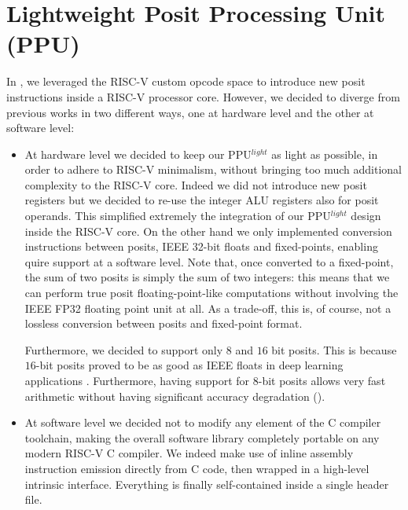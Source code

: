 \section{Lightweight Posit Processing Unit (PPU)}

In \cite{ppulight}, we leveraged the RISC-V custom opcode space to introduce new posit instructions inside a RISC-V processor core.
However, we decided to diverge from previous works in two different ways, one at hardware level and the other at software level:
\begin{itemize}
    \item At hardware level we decided to keep our PPU$^{light}$ as light as possible, in order to adhere to RISC-V minimalism, without bringing too much additional complexity to the RISC-V core. Indeed we did not introduce new posit registers but we decided to re-use the integer ALU registers also for posit operands. This simplified extremely the integration of our PPU$^{light}$ design inside the RISC-V core. On the other hand we only implemented conversion instructions between posits, IEEE 32-bit floats  and fixed-points, enabling quire support at a software level. Note that, once converted to a fixed-point, the sum of two posits is simply the sum of two integers: this means that we can perform true posit floating-point-like computations without involving the IEEE FP32 floating point unit at all. As a trade-off, this is, of course, not a lossless conversion between posits and fixed-point format.
    
    Furthermore, we decided to support only $8$ and $16$ bit posits. This is because $16$-bit posits proved to be as good as IEEE floats in deep learning applications \cite{deeppositron,positnn,9066876}. Furthermore, having support for $8$-bit posits allows very fast arithmetic without having significant accuracy degradation (\cite{coco_et_al_ieeespm_2020,coco2020sensors}).
    \item At software level we decided not to modify any element of the C compiler toolchain, making the overall software library completely portable on any modern RISC-V C compiler. We indeed make use of inline assembly instruction emission directly from C code, then wrapped in a high-level intrinsic interface. Everything is finally self-contained inside a single header file.
\end{itemize}

